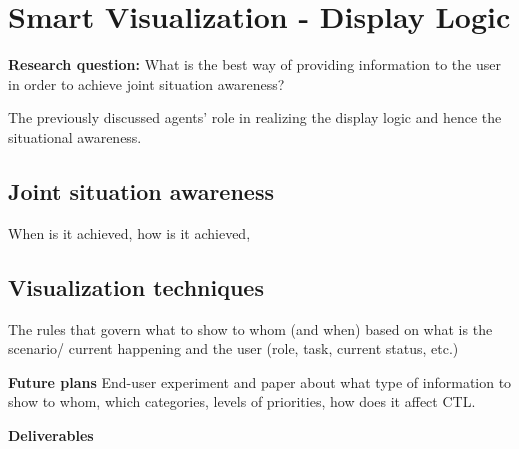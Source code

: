 \section{Smart Visualization - Display Logic}

\textbf{Research question:} What is the best way of providing information to the user in order to achieve joint situation awareness? 

The previously discussed agents' role in realizing the display logic and hence the situational awareness.

\subsection{Joint situation awareness}

When is it achieved, how is it achieved,

\subsection{Visualization techniques}

The rules that govern what to show to whom (and when) based on what is the scenario/ current happening and the user (role, task, current status, etc.) 

\textbf{Future plans} End-user experiment and paper about what type of information to show to whom, which categories, levels of priorities, how does it affect CTL.
  
\textbf{Deliverables}
  
  
  
  
  